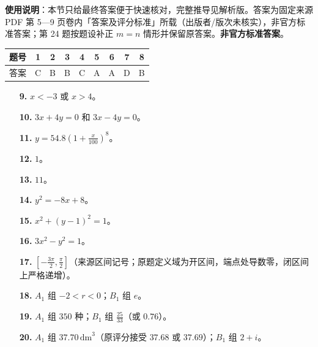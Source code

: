 
\begin{gknotice}
\textbf{使用说明}：本节只给最终答案便于快速核对，完整推导见解析版。答案为固定来源 PDF 第 5—9 页卷内「答案及评分标准」所载（出版者/版次未核实），非官方标准答案；第 24 题按题设补正 $m=n$ 情形并保留原答案。\textbf{非官方标准答案}。
\end{gknotice}

\begin{center}\begin{tabular}{ccccccccc}
\toprule
题号 & 1 & 2 & 3 & 4 & 5 & 6 & 7 & 8 \\
\midrule
答案 & C & B & B & C & A & A & D & B \\
\bottomrule
\end{tabular}\end{center}

\begin{itemize}[leftmargin=2.6em]
  \item[\textbf{9.}] $x<-3$ 或 $x>4$。
  \item[\textbf{10.}] $3x+4y=0$ 和 $3x-4y=0$。
  \item[\textbf{11.}] $y=54.8\left(1+\frac{x}{100}\right)^8$。
  \item[\textbf{12.}] $1$。
  \item[\textbf{13.}] $11$。
  \item[\textbf{14.}] $y^2=-8x+8$。
  \item[\textbf{15.}] $x^2+(y-1)^2=1$。
  \item[\textbf{16.}] $3x^2-y^2=1$。
  \item[\textbf{17.}] $\left[-\frac{3\pi}{2},\frac\pi2\right]$（来源区间记号；原题定义域为开区间，端点处导数零，闭区间上严格递增）。
  \item[\textbf{18.}] $A_1$ 组 $-2<r<0$；$B_1$ 组 $e$。
  \item[\textbf{19.}] $A_1$ 组 $350$ 种；$B_1$ 组 $\frac{25}{33}$（或 $0.76$）。
  \item[\textbf{20.}] $A_1$ 组 $37.70\,\mathrm{dm}^3$（原评分接受 $37.68$ 或 $37.69$）；$B_1$ 组 $2+i$。
\end{itemize}

